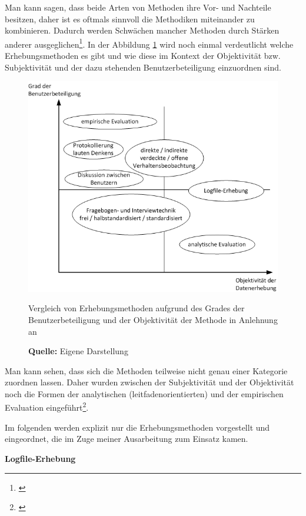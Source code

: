 Man kann sagen, dass beide Arten von Methoden ihre Vor- und Nachteile besitzen, daher ist es oftmals sinnvoll die Methodiken miteinander zu kombinieren. Dadurch werden Schwächen mancher Methoden durch Stärken anderer ausgeglichen\footnote{\cite[vgl.][261]{Pruemper1997}}. In der Abbildung \ref{fig:erhebungsmethodenObjektivitaetBenutzerbeteiligung} wird noch einmal verdeutlicht welche Erhebungsmethoden es gibt und wie diese im Kontext der Objektivität bzw. Subjektivität und der dazu stehenden Benutzerbeteiligung einzuordnen sind.
\begin{figure}[H]
  \centering
  \includegraphics[scale=0.8]{img/Datenerhebungsmethoden_Objektivitaet_Benutzerbeteiligung.png}
  \caption{Vergleich von Erhebungsmethoden aufgrund des Grades der Benutzerbeteiligung und der Objektivität der Methode in Anlehnung an \citep[vgl.][16]{Hegner2003}}
  \caption*{\textbf{Quelle:} Eigene Darstellung}
  \label{fig:erhebungsmethodenObjektivitaetBenutzerbeteiligung}
\end{figure}
Man kann sehen, dass sich die Methoden teilweise nicht genau einer Kategorie zuordnen lassen. Daher wurden zwischen der Subjektivität und der Objektivität noch die Formen der analytischen (leitfadenorientierten) und der empirischen Evaluation eingeführt\footnote{\cite[vgl.][15]{Hegner2003}}.

Im folgenden werden explizit nur die Erhebungsmethoden vorgestellt und eingeordnet, die im Zuge meiner Ausarbeitung zum Einsatz kamen.

\textbf{Logfile-Erhebung}

